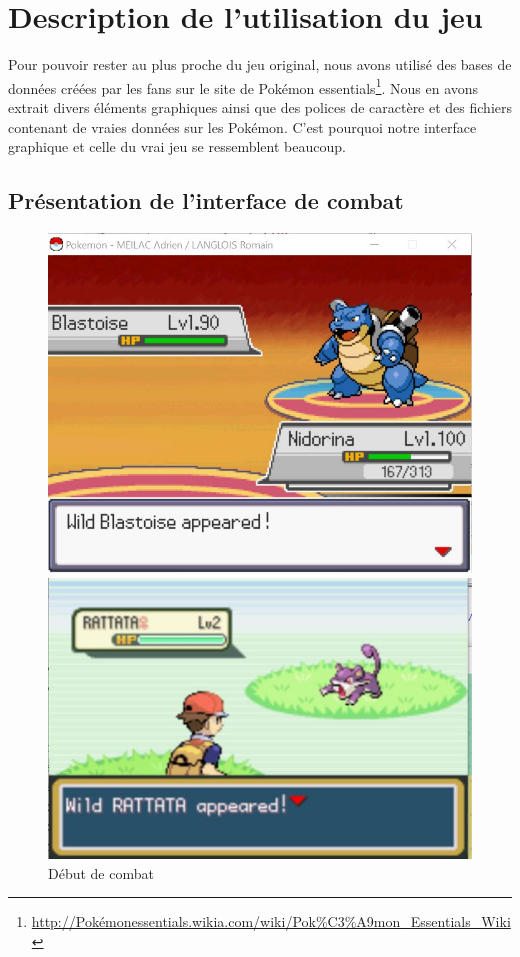 \section{Description de l'utilisation du jeu}
Pour pouvoir rester au plus proche du jeu original, nous avons utilisé des bases de données créées par les fans sur le site de Pokémon essentials\footnote{\url{http://Pokémonessentials.wikia.com/wiki/Pok\%C3\%A9mon\_Essentials\_Wiki}}. Nous en avons extrait divers éléments graphiques ainsi que des polices de caractère et des fichiers contenant de vraies données sur les Pokémon. C'est pourquoi notre  interface graphique et celle du vrai jeu se ressemblent beaucoup. 

\subsection{Présentation de l'interface de combat}
\begin{figure}[!h]
\begin{minipage}{0.49\textwidth}
\includegraphics[scale = 0.6]{../Images/combat_start.jpg}
\end{minipage}
\begin{minipage}{0.49\textwidth}
\includegraphics[scale = 0.84]{../Images/vrai_jeu_combat_start.jpg}
\end{minipage}
\caption{Début de combat}
\end{figure}

